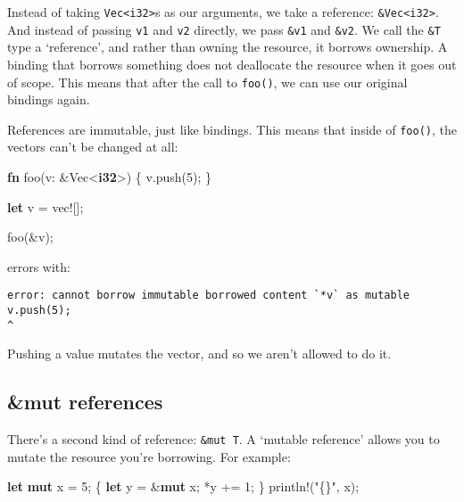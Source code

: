 \documentclass[a4paper,]{book}
\newenvironment{Shaded}{\begin{snugshade}}{\end{snugshade}}
\newcommand{\KeywordTok}[1]{\textcolor[rgb]{0.13,0.29,0.53}{\textbf{{#1}}}}
\newcommand{\DecValTok}[1]{\textcolor[rgb]{0.00,0.00,0.81}{{#1}}}
\newcommand{\StringTok}[1]{\textcolor[rgb]{0.31,0.60,0.02}{{#1}}}
\newcommand{\OtherTok}[1]{\textcolor[rgb]{0.56,0.35,0.01}{{#1}}}
\newcommand{\NormalTok}[1]{{#1}}
\begin{document}
Instead of taking \texttt{Vec\textless{}i32\textgreater{}}s as our
arguments, we take a reference:
\texttt{\&Vec\textless{}i32\textgreater{}}. And instead of passing
\texttt{v1} and \texttt{v2} directly, we pass \texttt{\&v1} and
\texttt{\&v2}. We call the \texttt{\&T} type a `reference', and rather
than owning the resource, it borrows ownership. A binding that borrows
something does not deallocate the resource when it goes out of scope.
This means that after the call to \texttt{foo()}, we can use our
original bindings again.

References are immutable, just like bindings. This means that inside of
\texttt{foo()}, the vectors can't be changed at all:

\begin{Shaded}
\begin{Highlighting}[]
\KeywordTok{fn} \NormalTok{foo(v: &Vec<}\KeywordTok{i32}\NormalTok{>) \{}
     \NormalTok{v.push(}\DecValTok{5}\NormalTok{);}
\NormalTok{\}}

\KeywordTok{let} \NormalTok{v = }\OtherTok{vec!}\NormalTok{[];}

\NormalTok{foo(&v);}
\end{Highlighting}
\end{Shaded}

errors with:

\begin{verbatim}
error: cannot borrow immutable borrowed content `*v` as mutable
v.push(5);
^
\end{verbatim}

Pushing a value mutates the vector, and so we aren't allowed to do it.

\subsection{\&mut references}\label{mut-references}

There's a second kind of reference: \texttt{\&mut\ T}. A `mutable
reference' allows you to mutate the resource you're borrowing. For
example:

\begin{Shaded}
\begin{Highlighting}[]
\KeywordTok{let} \KeywordTok{mut} \NormalTok{x = }\DecValTok{5}\NormalTok{;}
\NormalTok{\{}
    \KeywordTok{let} \NormalTok{y = &}\KeywordTok{mut} \NormalTok{x;}
    \NormalTok{*y += }\DecValTok{1}\NormalTok{;}
\NormalTok{\}}
\OtherTok{println!}\NormalTok{(}\StringTok{"\{\}"}\NormalTok{, x);}
\end{Highlighting}
\end{Shaded}
\end{document}
